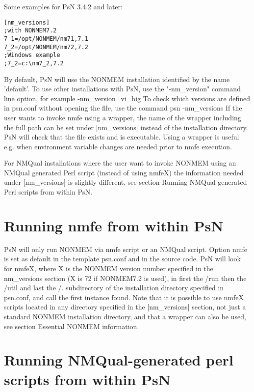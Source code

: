 Some examples for PsN 3.4.2 and later:
\begin{verbatim}
[nm_versions]
;with NONMEM7.2 
7_1=/opt/NONMEM/nm71,7.1
7_2=/opt/NONMEM/nm72,7.2
;Windows example
;7_2=c:\nm7_2,7.2
\end{verbatim}
By default, PsN will use the NONMEM installation identified by the name 'default'. To use other installations with PsN, use the "-nm\_version" command line option, for example -nm\_version=vi\_big
To check which versions are defined in psn.conf without opening the file, use the command 
psn -nm\_versions
If the user wants to invoke nmfe using a wrapper, the name of the wrapper including the full path can be set under [nm\_versions] instead of the installation directory. PsN will check that the file exists and is executable. Using a wrapper is useful e.g. when environment variable changes are needed prior to nmfe execution.

For NMQual installations where the user want to invoke NONMEM using an NMQual generated Perl script (instead of using nmfeX) the information needed under [nm\_versions] is slightly different, see section Running NMQual-generated Perl scripts from within PsN.


\section{Running nmfe from within PsN}

PsN will only run NONMEM via nmfe script or an NMQual script. Option nmfe is set as default in the template psn.conf and in the source code. PsN will look for nmfeX, where X is the NONMEM version number specified in the nm\_versions section (X is 72 if NONMEM7.2 is used),  in first the /run then the  /util and last the /. subdirectory of the installation directory specified in psn.conf, and call the first instance found. Note that it is possible to use nmfeX scripts located in any directory specified in the [nm\_versions] section, not just a standard NONMEM installation directory, and that a wrapper can also be used, see section Essential NONMEM information.

\section{Running  NMQual-generated perl scripts from within PsN}

